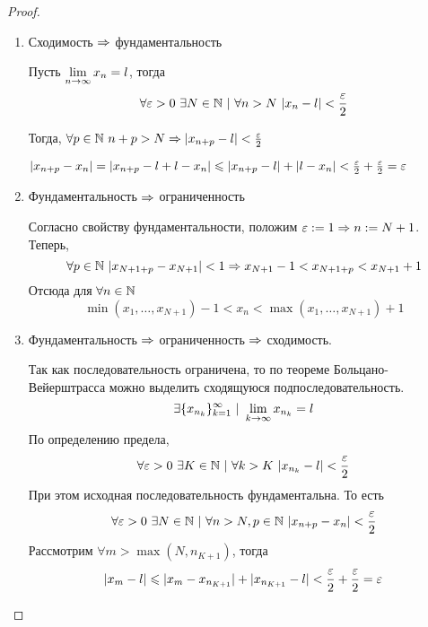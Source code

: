 \begin{proof}
	\begin{enumerate}
		\item Сходимость $\Rightarrow$ фундаментальность
		
		Пусть $\lim\limits_{n \rightarrow \infty} x_n = l$, тогда
		$$
			\forall \eps > 0\ \exists N \in \N\ |\ \forall n > N\ |x_n - l| < \frac{\eps}{2}
		$$
		
		Тогда, $\forall p \in \mathbb{N}\ n + p > N \Rightarrow |x_{n + p} - l| < \frac{\varepsilon}{2}$
		
		$|x_{n + p} - x_n| = |x_{n + p} - l + l - x_n| \leqslant |x_{n + p} - l| + |l - x_n| < \frac{\varepsilon}{2} + \frac{\varepsilon}{2} = \varepsilon$
		
		\item Фундаментальность $\Rightarrow$ ограниченность
		
		Согласно свойству фундаментальности, положим $\varepsilon := 1 \Rightarrow n := N + 1$. Теперь, 
		$$
			\forall p \in \mathbb{N}\ |x_{N + 1 + p} - x_{N + 1}| < 1 \Rightarrow x_{N + 1} - 1 < x_{N + 1 + p} < x_{N + 1} + 1
		$$
		Отсюда для $\forall n \in \mathbb{N}$
		$$
			\min(x_1, \dots, x_{N + 1}) - 1 < x_n < \max(x_1, \dots, x_{N + 1}) + 1
 		$$
 		
 		\item Фундаментальность $\Rightarrow$ ограниченность $\Rightarrow$ сходимость. 
 		
		Так как последовательность ограничена, то по теореме Больцано-Вейерштрасса можно выделить сходящуюся подпоследовательность.
		$$
			\exists \{x_{n_k}\}_{k = 1}^\infty\ |\ \liml_{k \to \infty} x_{n_k} = l
		$$
		По определению предела,
		$$
			\forall \varepsilon > 0\ \exists K \in \mathbb{N}\ |\ \forall k > K\ |x_{n_k} - l| < \frac{\varepsilon}{2}
		$$
		При этом исходная последовательность фундаментальна. То есть
		$$
			\forall \varepsilon > 0\ \exists N \in \mathbb{N}\ |\ \forall n > N, p \in \mathbb{N}\ |x_{n + p} - x_n| < \frac{\varepsilon}{2}
		$$
		Рассмотрим $\forall                                                                                                                                                                                                                                                                                                                                                                                                                                                       m > \max(N, n_{K + 1})$, тогда
		$$
			|x_m - l| \leqslant |x_m - x_{n_{K + 1}}| + |x_{n_{K + 1}} - l| < \frac{\varepsilon}{2} + \frac{\varepsilon}{2} = \varepsilon
		$$
	\end{enumerate}
\end{proof}

